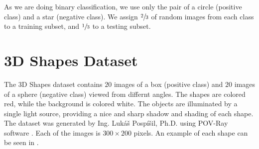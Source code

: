 As we are doing binary classification, we use only the pair of a circle (positive class) and a star (negative class). We assign $\sfrac{2}{3}$ of random images from each class to a training subset, and $\sfrac{1}{3}$ to a testing subset.

\section{3D Shapes Dataset}\label{sec:3d-dataset}
The 3D Shapes dataset contains $20$ images of a box (positive class) and $20$ images of a sphere (negative class) viewed from differnt angles. The shapes are colored red, while the background is colored white. The objects are illuminated by a single light source, providing a nice and sharp shadow and shading of each shape. The dataset was generated by Ing. Lukáš Pospíšil, Ph.D. using POV-Ray software \cite{povray}. Each of the images is $300\times200$ pixels. An example of each shape can be seen in .
